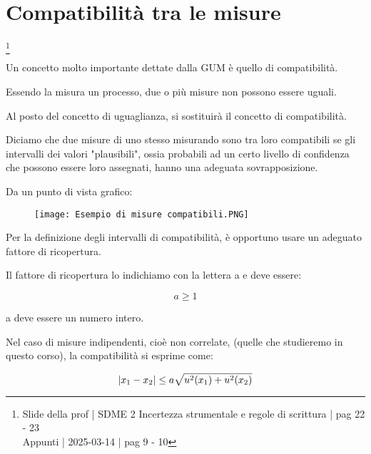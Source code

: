 \newpage 

\section{Compatibilità tra le misure}
\footnote{Slide della prof | SDME 2 Incertezza strumentale e regole di scrittura | pag 22 - 23 \\  
Appunti | 2025-03-14 | pag 9 - 10}

Un concetto molto importante dettate dalla GUM è quello di compatibilità. \newline

Essendo la misura un processo, due o più misure non possono essere uguali. \newline 

Al posto del concetto di uguaglianza, si sostituirà il concetto di compatibilità. \newline 

Diciamo che due misure di uno stesso misurando sono tra loro compatibili se gli intervalli dei valori "plausibili", 
ossia probabili ad un certo livello di confidenza che possono essere loro assegnati, 
hanno una adeguata sovrapposizione. \newline 

Da un punto di vista grafico: 

\begin{figure}[h]
    \centering
    \texttt{[image: Esempio di misure compatibili.PNG]}
\end{figure}

Per la definizione degli intervalli di compatibilità, 
è opportuno usare un adeguato fattore di ricopertura. \newline 

Il fattore di ricopertura lo indichiamo con la lettera a e deve essere: 

{
    \Large 
    \begin{equation}
        a \ge 1
    \end{equation}
}

a deve essere un numero intero. \newline

Nel caso di misure indipendenti, cioè non correlate, (quelle che studieremo in questo corso), 
la compatibilità si esprime come: 

{
    \Large 
    \begin{equation}
        \abs{x_1 - x_2} 
        \le 
        a \sqrt{u^{2}(x_1) + u^{2}(x_2)}
    \end{equation}
}

